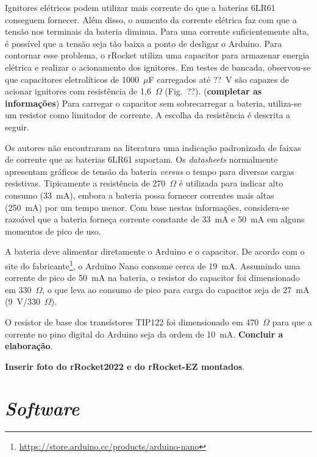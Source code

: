 \documentclass[12pt,a4paper]{article}
\begin{document}
Ignitores elétricos podem utilizar mais corrente do que a baterias 6LR61 conseguem fornecer. Além disso, o aumento da corrente elétrica faz com que a tensão nos terminais da bateria diminua. Para uma corrente suficientemente alta, é possível que a tensão seja tão baixa a ponto de desligar o Arduino. Para contornar esse problema, o rRocket utiliza uma capacitor para armazenar energia elétrica e realizar o acionamento dos ignitores. Em testes de bancada, observou-se que capacitores eletrolíticos de 1000~$\mu$F carregados até ??~V são capazes de acionar ignitores com resistência de 1,6~$\Omega$ (Fig.~??). (\textbf{completar as informações}) Para carregar o capacitor sem sobrecarregar a bateria, utiliza-se um resistor como limitador de corrente. A escolha da resistência é descrita a seguir.
 
 Os autores não encontraram na literatura uma indicação padronizada de faixas de corrente que as baterias 6LR61 suportam. Os \textit{datasheets} normalmente apresentam gráficos de tensão da bateria \textit{versus} o tempo para diversas cargas resistivas. Tipicamente a resistência de 270~$\Omega$ é utilizada para indicar alto consumo (33~mA), embora a bateria possa fornecer correntes mais altas (250~mA) por um tempo menor. Com base nestas informações, considera-se razoável que a bateria forneça corrente constante de 33~mA e 50~mA em alguns momentos de pico de uso. 
 
A bateria deve alimentar diretamente o Arduino e o capacitor. 
De acordo com o site do fabricante\footnote{\url{https://store.arduino.cc/products/arduino-nano}}, o Arduino Nano consome cerca de 19~mA. Assumindo  uma corrente de pico de 50~mA na bateria, o resistor do capacitor foi dimensionado em 330~$\Omega$, o que leva ao consumo de pico para carga do capacitor seja de 27~mA (9~V/330~$\Omega$). 


O resistor de base dos transístores TIP122 foi dimensionado em 470~$\Omega$ para que a corrente no pino digital do Arduino seja da ordem de 10~mA. \textbf{Concluir a elaboração}.


\textbf{Inserir foto do rRocket2022 e do rRocket-EZ montados}.

\section{\textit{Software}}
\label{sec:software}

\end{document}
